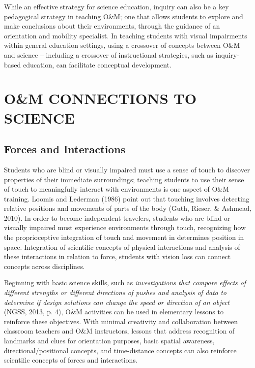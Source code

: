 \documentclass[11.5pt]{sig-alternate} %
\begin{document}
\begin{large}
While an effective strategy for science education, inquiry can also be a key pedagogical strategy in teaching O\&M; one that allows students to explore and make conclusions about their environments, through the guidance of an orientation and mobility specialist. In teaching students with visual impairments within general education settings, using a crossover of concepts between O\&M and science – including a crossover of instructional strategies, such as inquiry-based education, can facilitate conceptual development.

\section*{O\&M CONNECTIONS TO SCIENCE}

\subsection*{Forces and Interactions}

Students who are blind or visually impaired must use a sense of touch to discover properties of their immediate surroundings; teaching students to use their sense of touch to meaningfully interact with environments is one aspect of O\&M training. Loomis and Lederman (1986) point out that touching involves detecting relative positions and movements of parts of the body (Guth, Rieser, \& Ashmead, 2010). In order to become independent travelers, students who are blind or visually impaired must experience environments through touch, recognizing how the proprioceptive integration of touch and movement in determines position in space. Integration of scientific concepts of physical interactions and analysis of these interactions in relation to force, students with vision loss can connect concepts across disciplines.
	
Beginning with basic science skills, such as \textit{investigations that compare effects of different strengths or different directions of pushes and analysis of data to determine if design solutions can change the speed or direction of an object} (NGSS, 2013, p. 4), O\&M activities can be used in elementary lessons to reinforce these objectives.  With minimal creativity and collaboration between classroom teachers and O\&M instructors, lessons that address recognition of landmarks and clues for orientation purposes, basic spatial awareness, directional/positional concepts, and time-distance concepts can also reinforce scientific concepts of forces and interactions.
	

\end{large}
\end{document}
